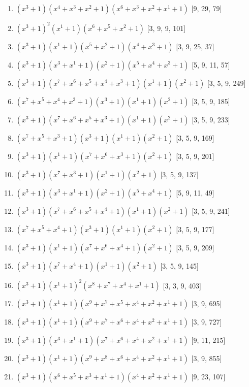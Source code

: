 \documentclass[10pt,twocolumn]{article}
\begin{document}
\begin{enumerate}
\item $(x^{3} + 1)(x^{4} + x^{3} + x^{2} + 1)(x^{6} + x^{3} + x^{2} + x^{1} + 1)$  [9, 29, 79]
\item $(x^{3} + 1)^{2}(x^{1} + 1)(x^{6} + x^{5} + x^{2} + 1)$  [3, 9, 9, 101]
\item $(x^{3} + 1)(x^{1} + 1)(x^{5} + x^{2} + 1)(x^{4} + x^{3} + 1)$  [3, 9, 25, 37]
\item $(x^{3} + 1)(x^{3} + x^{1} + 1)(x^{2} + 1)(x^{5} + x^{4} + x^{3} + 1)$  [5, 9, 11, 57]
\item $(x^{3} + 1)(x^{7} + x^{6} + x^{5} + x^{4} + x^{3} + 1)(x^{1} + 1)(x^{2} + 1)$  [3, 5, 9, 249]
\item $(x^{7} + x^{5} + x^{4} + x^{3} + 1)(x^{3} + 1)(x^{1} + 1)(x^{2} + 1)$  [3, 5, 9, 185]
\item $(x^{3} + 1)(x^{7} + x^{6} + x^{5} + x^{3} + 1)(x^{1} + 1)(x^{2} + 1)$  [3, 5, 9, 233]
\item $(x^{7} + x^{5} + x^{3} + 1)(x^{3} + 1)(x^{1} + 1)(x^{2} + 1)$  [3, 5, 9, 169]
\item $(x^{3} + 1)(x^{1} + 1)(x^{7} + x^{6} + x^{3} + 1)(x^{2} + 1)$  [3, 5, 9, 201]
\item $(x^{3} + 1)(x^{7} + x^{3} + 1)(x^{1} + 1)(x^{2} + 1)$  [3, 5, 9, 137]
\item $(x^{3} + 1)(x^{3} + x^{1} + 1)(x^{2} + 1)(x^{5} + x^{4} + 1)$  [5, 9, 11, 49]
\item $(x^{3} + 1)(x^{7} + x^{6} + x^{5} + x^{4} + 1)(x^{1} + 1)(x^{2} + 1)$  [3, 5, 9, 241]
\item $(x^{7} + x^{5} + x^{4} + 1)(x^{3} + 1)(x^{1} + 1)(x^{2} + 1)$  [3, 5, 9, 177]
\item $(x^{3} + 1)(x^{1} + 1)(x^{7} + x^{6} + x^{4} + 1)(x^{2} + 1)$  [3, 5, 9, 209]
\item $(x^{3} + 1)(x^{7} + x^{4} + 1)(x^{1} + 1)(x^{2} + 1)$  [3, 5, 9, 145]
\item $(x^{3} + 1)(x^{1} + 1)^{2}(x^{8} + x^{7} + x^{4} + x^{1} + 1)$  [3, 3, 9, 403]
\item $(x^{3} + 1)(x^{1} + 1)(x^{9} + x^{7} + x^{5} + x^{4} + x^{2} + x^{1} + 1)$  [3, 9, 695]
\item $(x^{3} + 1)(x^{1} + 1)(x^{9} + x^{7} + x^{6} + x^{4} + x^{2} + x^{1} + 1)$  [3, 9, 727]
\item $(x^{3} + 1)(x^{3} + x^{1} + 1)(x^{7} + x^{6} + x^{4} + x^{2} + x^{1} + 1)$  [9, 11, 215]
\item $(x^{3} + 1)(x^{1} + 1)(x^{9} + x^{8} + x^{6} + x^{4} + x^{2} + x^{1} + 1)$  [3, 9, 855]
\item $(x^{3} + 1)(x^{6} + x^{5} + x^{3} + x^{1} + 1)(x^{4} + x^{2} + x^{1} + 1)$  [9, 23, 107]

\end{enumerate}
\end{document}
